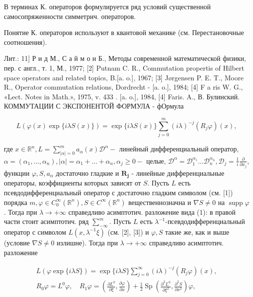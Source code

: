 \documentclass[10pt]{article}
\begin{document}
В терминах К. операторов формулируется ряд условий существенной самосопряженности симметрич. операторов.



Понятие К. операторов используют в квантовой механике (см. Перестановочные соотношения).



Лит.: 11] Р и д М., С а й м о н Б., Методы современной математической физики, пер. с англ., т. 1, М., 1977; [2] Putnam C. R., Commutation propertis of Hilbert space operators and related topics, B.[a. o.], 1967; [3] Jørgensen P. E. T., Moore R., Operator commutation relations, Dordrecht - [a. o.], 1984; [4] F a ris W. G., «Lect. Notes in Math.», 1975, v. 433 . [a. o.], 1984, [4] Faris. A., В. Булинский. КОММУТАЦИИ С ЭКСПОНЕНТОЙ ФОРМУЛА - фОрмула



\[

L(\varphi(x) \exp \{i \lambda S(x)\})=\exp \{i \lambda S(x)\} \sum_{j=0}^{m}(i \lambda)^{-j}\left(R_{j} \varphi\right)(x),

\]



где $x \in \mathbb{R}^{n}, L=\sum_{|\alpha|=0}^{m} a_{\alpha}(x) \mathscr{D}^{\alpha}-$ линейный дифференциальный оператор, $\alpha=\left(\alpha_{1}, \ldots, \alpha_{n}\right),|\alpha|=\alpha_{1}+\ldots+\alpha_{n}, \alpha_{j} \geqslant 0-$ целые, $\mathscr{D}^{\alpha}=\mathscr{D}_{1}^{\alpha_{1}} \ldots \mathscr{D}_{n}^{\alpha_{n}}, \mathscr{D}_{j}=\frac{1}{i} \frac{\partial}{\partial x_{j}}$, функции $\varphi, S, a_{\alpha}$ достаточно гладкие и $\boldsymbol{R}_{\boldsymbol{j}}$ - линейные дифференциальные операторы, коэффициенты которых зависят от $S$. Пусть $L$ есть псевдодифференциальный оператор с достаточно гладким символом (см. [1]) порядка $m, \varphi \in C_{0}^{\infty}\left(\mathbb{R}^{n}\right), S \in C^{\infty}\left(\mathbb{R}^{n}\right)$ вещественнозначна и $\nabla S \neq 0$ на $\operatorname{supp} \varphi$. Тогда при $\lambda \rightarrow+\infty$ справедливо асимптотич. разложение вида (1): в правой части стоит асимптотич. ряд $\sum_{-\infty}^{m}$. Пусть $L$ есть $\lambda^{-1}$-псевдодифференциальный оператор с символом $L\left(x, \lambda^{-1} \xi\right)$ (см. [2], [3]) и $\varphi, S$ такие же, как и выше (условие $\nabla S \neq 0$ излишне). Тогда при $\lambda \rightarrow+\infty$ справедливо асимптотич. разложение



\[

\begin{gathered}

L(\varphi \exp \{i \lambda S\})=\exp \{i \lambda S\} \sum_{j=0}^{\infty}(i \lambda)^{-j}\left(R_{j} \varphi\right)(x), \\

R_{0} \varphi=L^{0} \varphi, \quad R_{1} \varphi=\left(\frac{\partial L^{0}}{\partial \xi}, \frac{\partial \varphi}{\partial x}\right)+\frac{1}{2} \operatorname{Sp}\left(\frac{\partial^{2} L^{0}}{\partial \xi^{2}}, \frac{\partial^{2} S}{\partial x^{2}}\right) \varphi,

\end{gathered}

\]
\end{document}
